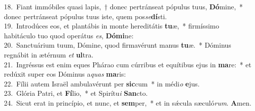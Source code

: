 {18.~}Fiant immóbiles quasi lapis,~† donec pertránseat pópulus tuus, \textbf{Dó}mine,~* donec pertránseat pópulus tuus iste, quem pos\textit{se}\textbf{dí}sti.\\
{19.~}Introdúces eos, et plantábis in monte hereditátis \textbf{tu}æ,~* firmíssimo habitáculo tuo quod operátus \textit{es}, \textbf{Dó}\textbf{mi}ne:\\
{20.~}Sanctuárium tuum, Dómine, quod firmavérunt manus \textbf{tu}æ.~* Dóminus regnábit in ætérnum \textit{et} \textbf{ul}tra.\\
{21.~}Ingréssus est enim eques Phárao cum cúrribus et equítibus ejus in \textbf{ma}re:~* et redúxit super eos Dóminus a\textit{quas} \textbf{ma}ris:\\
{22.~}Fílii autem Israël ambulavérunt per \textbf{sic}cum~* in médi\textit{o} \textbf{e}jus.\\
{23.~}Glória Patri, et \textbf{Fí}lio,~* et Spirítu\textit{i} \textbf{San}cto.\\
{24.~}Sicut erat in princípio, et nunc, et \textbf{sem}per,~* et in sǽcula sæculó\textit{rum}. \textbf{A}men.\\
